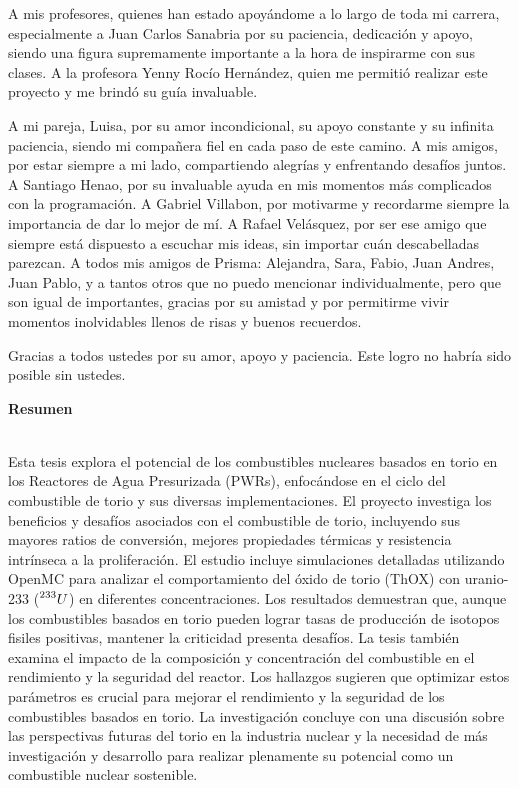 A mis profesores, quienes han estado apoyándome a lo largo de toda mi carrera, especialmente a Juan Carlos Sanabria por su paciencia, dedicación y apoyo, siendo una figura supremamente importante a la hora de inspirarme con sus clases. A la profesora Yenny Rocío Hernández, quien me permitió realizar este proyecto y me brindó su guía invaluable.

A mi pareja, Luisa, por su amor incondicional, su apoyo constante y su infinita paciencia, siendo mi compañera fiel en cada paso de este camino. A mis amigos, por estar siempre a mi lado, compartiendo alegrías y enfrentando desafíos juntos. A Santiago Henao, por su invaluable ayuda en mis momentos más complicados con la programación. A Gabriel Villabon, por motivarme y recordarme siempre la importancia de dar lo mejor de mí. A Rafael Velásquez, por ser ese amigo que siempre está dispuesto a escuchar mis ideas, sin importar cuán descabelladas parezcan. A todos mis amigos de Prisma: Alejandra, Sara, Fabio, Juan Andres, Juan Pablo, y a tantos otros que no puedo mencionar individualmente, pero que son igual de importantes, gracias por su amistad y por permitirme vivir momentos inolvidables llenos de risas y buenos recuerdos.

Gracias a todos ustedes por su amor, apoyo y paciencia. Este logro no habría sido posible sin ustedes.
\newpage

\textbf{\LARGE Resumen}
\\
Esta tesis explora el potencial de los combustibles nucleares basados en torio en los Reactores de Agua Presurizada (PWRs), enfocándose en el ciclo del combustible de torio y sus diversas implementaciones. El proyecto investiga los beneficios y desafíos asociados con el combustible de torio, incluyendo sus mayores ratios de conversión, mejores propiedades térmicas y resistencia intrínseca a la proliferación. El estudio incluye simulaciones detalladas utilizando OpenMC para analizar el comportamiento del óxido de torio (ThOX) con uranio-233 (\(\prescript{233}{}{U}\)) en diferentes concentraciones. Los resultados demuestran que, aunque los combustibles basados en torio pueden lograr tasas de producción de isotopos fisiles positivas, mantener la criticidad presenta desafíos. La tesis también examina el impacto de la composición y concentración del combustible en el rendimiento y la seguridad del reactor. Los hallazgos sugieren que optimizar estos parámetros es crucial para mejorar el rendimiento y la seguridad de los combustibles basados en torio. La investigación concluye con una discusión sobre las perspectivas futuras del torio en la industria nuclear y la necesidad de más investigación y desarrollo para realizar plenamente su potencial como un combustible nuclear sostenible.

